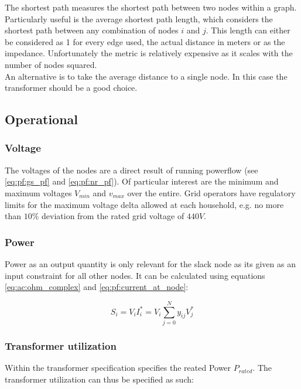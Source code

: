 The shortest path measures the shortest path between two nodes within a graph.
Particularly useful is the average shortest path length, which considers
the shortest path between any combination of nodes $i$ and $j$. This length can
either be considered as 1 for every edge used, the actual distance in meters or
as the impedance. Unfortunately
the metric is relatively expensive as it scales with the number of nodes squared.\\
An alternative is to take the average distance to a single node. In this case the
transformer should be a good choice.

\subsection{Operational}

\subsubsection{Voltage}

The voltages of the nodes are a direct result of running powerflow 
(see \autoref{eq:pf:gs_pf} and \autoref{eq:pf:nr_pf}). Of particular
interest are the minimum and maximum voltages $V_{min}$ and $v_{max}$
over the entire. Grid operators have regulatory limits for the maximum
voltage delta allowed at each household, e.g. no more than $10\%$
deviation from the rated grid voltage of $440V$\autocite{venios}.

\subsubsection{Power}

Power as an output quantity is only relevant for the slack node as its
given as an input constraint for all other nodes. It can be calculated
using equations \ref{eq:ac:ohm_complex} and \ref{eq:pf:current_at_node}:

\begin{equation}
  S_i = V_i I_i^* = V_i \sum_{j = 0}^N y_{ij} V_j^*
\end{equation}

\subsubsection{Transformer utilization}

Within the transformer specification specifies the reated Power $P_{rated}$.
The transformer utilization can thus be specified as such:

